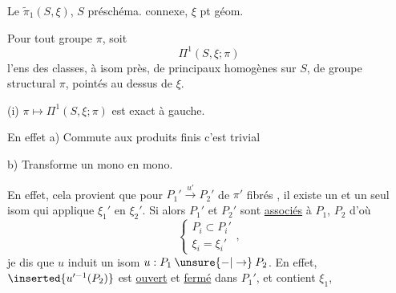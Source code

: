 Le $\widetilde{\pi}_1(S,\xi)$, $S$ préschéma. connexe, $\xi$ pt géom.

Pour tout groupe $\pi$, soit
\[
\Pi^1(S,\xi;\pi)
\]
l'ens des classes, à isom près, de  principaux homogènes sur $S$, de groupe structural $\pi$, pointés au dessus de $\xi$.

(i) $\pi\mapsto\Pi^1(S,\xi;\pi)$ est exact à gauche.

En effet a) Commute aux produits finis c'est trivial

b) Transforme un mono  en mono.

En effet, cela provient que pour   
$P_1'\overset{u'}{\longrightarrow}P_2'$ de  $\pi'$ fibrés , il existe un et un seul  isom qui applique $\xi_1'$ en $\xi_2'$.
Si alors $P_1'$ et $P_2'$ sont \uline{associés} à $P_1$, $P_2$ d'où
\[
\left\{\begin{array}{l}
P_i\subset P_i'\\
\xi_i=\xi_i'
\end{array}\right.,
\]
 je dis que $u$   induit un isom $u:P_1\mathbin{\unsure{-|\to}}P_2$.
En effet, 
$\inserted{u'^{-1}(P_2)}$ est \uline{ouvert} et \uline{fermé} dans $P_1'$, et contient $\xi_1$, 
